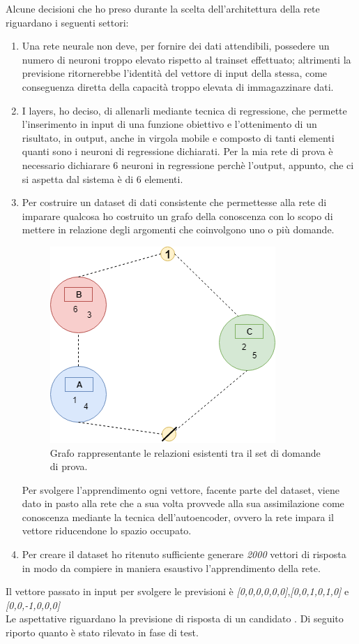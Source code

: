 Alcune decisioni che ho preso durante la scelta dell'architettura della rete riguardano i seguenti settori:
\begin{enumerate}
\item Una rete neurale non deve, per fornire dei dati attendibili, possedere un numero di neuroni troppo elevato rispetto al trainset effettuato; altrimenti la previsione  ritornerebbe l'identit\`a del vettore di input della stessa, come conseguenza diretta della capacit\`a troppo elevata di immagazzinare dati.
\item I layers, ho deciso, di allenarli mediante tecnica di regressione, che permette l'inserimento in input di una funzione obiettivo e l'ottenimento di un risultato, in output, anche in virgola mobile e composto di tanti elementi quanti sono i neuroni di regressione dichiarati. Per la mia rete di prova \`e necessario dichiarare  6 neuroni in regressione perch\`e l'output, appunto, che ci si aspetta dal sistema \`e di 6 elementi.
\item Per costruire un dataset di dati consistente che permettesse alla rete di imparare qualcosa ho costruito un grafo della conoscenza con lo scopo di mettere in relazione degli argomenti che coinvolgono uno o pi\`u domande.
\begin{figure}[H]
\centering
	\includegraphics[width=0.60\linewidth]{./image/grafo_trainset.png}
	\caption{Grafo rappresentante le relazioni esistenti tra il set di domande di prova.}
	\label{Grafo rappresentante le relazioni esistenti tra il set di domande di prova.}
\end{figure}
\noindent
Per svolgere l'apprendimento ogni vettore, facente parte del dataset, viene dato in pasto alla rete che a sua volta provvede alla sua assimilazione come conoscenza mediante la tecnica dell'autoencoder, ovvero la rete impara il vettore riducendone lo spazio occupato.
\item Per creare il dataset ho ritenuto sufficiente generare \textit{2000} vettori di risposta in modo da compiere in maniera esaustivo l'apprendimento della rete.
\end{enumerate}
\noindent
Il vettore passato in input per svolgere le previsioni \`e \textit{[0,0,0,0,0,0]},\textit{[0,0,1,0,1,0]} e \textit{[0,0,-1,0,0,0]}\\
Le aspettative riguardano la previsione di risposta di un candidato
\noindent. 
Di seguito riporto quanto \`e stato rilevato in fase di test.

